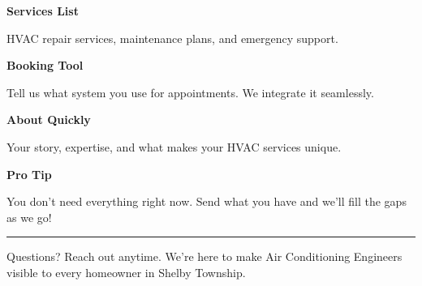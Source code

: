 \documentclass[11pt,letterpaper]{article}
\begin{document}
\hfill
\begin{minipage}[t]{0.48\textwidth}
\begin{tcolorbox}[colframe=accent-teal, boxrule=1pt, left=0.7em, right=0.7em, top=0.5em, bottom=0.5em, arc=4pt, boxsep=0pt]
{\bfseries\small\color{accent-teal}Services List}

\vspace{0.15em}

{\small HVAC repair services, maintenance plans, and emergency support.}
\end{tcolorbox}

\vspace{0.1em}

\begin{tcolorbox}[colframe=accent-teal, boxrule=1pt, left=0.7em, right=0.7em, top=0.5em, bottom=0.5em, arc=4pt, boxsep=0pt]
{\bfseries\small\color{accent-teal}Booking Tool}

\vspace{0.15em}

{\small Tell us what system you use for appointments. We integrate it seamlessly.}
\end{tcolorbox}

\vspace{0.1em}

\begin{tcolorbox}[colframe=accent-teal, boxrule=1pt, left=0.7em, right=0.7em, top=0.5em, bottom=0.5em, arc=4pt, boxsep=0pt]
{\bfseries\small\color{accent-teal}About Quickly}

\vspace{0.15em}

{\small Your story, expertise, and what makes your HVAC services unique.}
\end{tcolorbox}

\vspace{-0.2em}
\end{minipage}

\vspace{0.15em}

\begin{tcolorbox}[colback={accent-red!5}, colframe=accent-red!20, boxrule=0.5pt, left=0.7em, right=0.7em, top=0.4em, bottom=0.4em, arc=6pt, boxsep=0pt]

{\bfseries\small\color{accent-red}Pro Tip}

\vspace{0.1em}

{\small You don't need everything right now. Send what you have and we'll fill the gaps as we go!}

\end{tcolorbox}

\vspace{0.15em}

\noindent\hrule
\vspace{0.2em}

{\small\color{text-light}Questions? Reach out anytime. We're here to make Air Conditioning Engineers visible to every homeowner in Shelby Township.}
\end{document}
